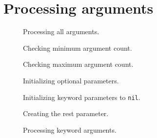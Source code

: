 \chapter{Processing arguments}

\begin{figure}
\begin{center}
\end{center}
\caption{\label{fig-process-arguments}
Processing all arguments.}
\end{figure}

\begin{figure}
\begin{center}
\end{center}
\caption{\label{fig-check-minimum-argument-count}
Checking minimum argument count.}
\end{figure}

\begin{figure}
\begin{center}
\end{center}
\caption{\label{fig-check-maximum-argument-count}
Checking maximum argument count.}
\end{figure}

\begin{figure}
\begin{center}
\end{center}
\caption{\label{fig-initialize-optional-parameters}
Initializing optional parameters.}
\end{figure}

\begin{figure}
\begin{center}
\end{center}
\caption{\label{fig-no-more-arguments}
Initializing keyword parameters to \texttt{nil}.}
\end{figure}

\begin{figure}
\begin{center}
\end{center}
\caption{\label{fig-create-rest-parameter}
Creating the rest parameter.}
\end{figure}

\begin{figure}
\begin{center}
\end{center}
\caption{\label{fig-process-keyword-arguments}
Processing keyword arguments.}
\end{figure}

